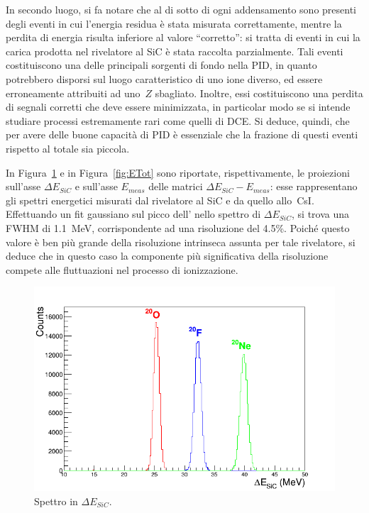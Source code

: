 In secondo luogo, si fa notare che al di sotto di ogni addensamento sono presenti degli eventi in cui l'energia residua è stata misurata correttamente, mentre la perdita di energia risulta inferiore al valore ``corretto'': si tratta di eventi in cui la carica prodotta nel rivelatore al SiC è stata raccolta parzialmente. 
Tali eventi costituiscono una delle principali sorgenti di fondo nella PID, in quanto potrebbero disporsi sul luogo caratteristico di uno ione diverso, ed essere erroneamente attribuiti ad uno~$Z$ sbagliato.
Inoltre, essi costituiscono una perdita di segnali corretti che deve essere minimizzata, in particolar modo se si intende studiare processi estremamente rari come quelli di DCE.
Si deduce, quindi, che per avere delle buone capacità di PID è essenziale che la frazione di questi eventi rispetto al totale sia piccola.











In Figura~\ref{fig:deltaE_Tot} e in Figura~\ref{fig:ETot} sono riportate, rispettivamente, le proiezioni sull'asse $\Delta E_{SiC}$ e sull'asse $E_{meas}$ delle matrici $\Delta E_{SiC} - E_{meas}$: esse rappresentano gli spettri energetici misurati dal rivelatore al SiC e da quello allo~CsI.
Effettuando un fit gaussiano sul picco dell' nello spettro di $\Delta E_{SiC}$, si trova una FWHM di 1.1~MeV, corrispondente ad una risoluzione del 4.5\%.
Poiché questo valore è ben più grande della risoluzione intrinseca assunta per tale rivelatore, si deduce che in questo caso la componente più significativa della risoluzione compete alle fluttuazioni nel processo di ionizzazione.

\begin{figure} [!p]
	\centering
	\includegraphics[scale=0.5]{Grafici_Tesi2/Particelle_monocromatiche/deltaE.png}
	\caption{Spettro in $ \Delta E_{SiC} $.} \label{fig:deltaE_Tot}
\end{figure}


